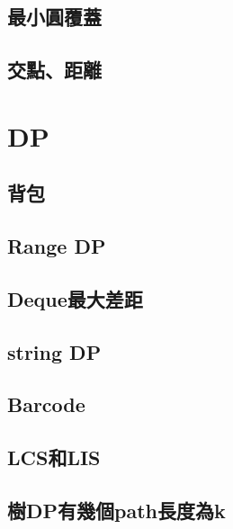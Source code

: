         \subsection{最小圓覆蓋}
        
        \subsection{交點、距離}
            
\clearpage

\section{DP}
    \subsection{背包}
         \columnbreak
    \subsection{Range DP}
        
    \subsection{Deque最大差距}
         \columnbreak
    \subsection{string DP}
        
    \subsection{Barcode}
        
    \subsection{LCS和LIS}
         \columnbreak
    \subsection{樹DP有幾個path長度為k}
        

